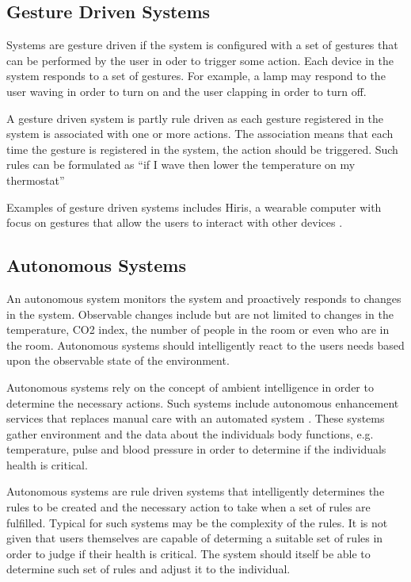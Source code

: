 \subsection{Gesture Driven Systems}

Systems are gesture driven if the system is configured with a set of gestures that can be performed by the user in oder to trigger some action. Each device in the system responds to a set of gestures. For example, a lamp may respond to the user waving in order to turn on and the user clapping in order to turn off.

A gesture driven system is partly rule driven as each gesture registered in the system is associated with one or more actions. The association means that each time the gesture is registered in the system, the action should be triggered. Such rules can be formulated as ``if I wave then lower the temperature on my thermostat''

Examples of gesture driven systems includes Hiris, a wearable computer with focus on gestures that allow the users to interact with other devices \cite{hirisweb}.

\subsection{Autonomous Systems}

An autonomous system monitors the system and proactively responds to changes in the system. Observable changes include but are not limited to changes in the temperature, CO2 index, the number of people in the room or even who are in the room.
Autonomous systems should intelligently react to the users needs based upon the observable state of the environment.

Autonomous systems rely on the concept of ambient intelligence in order to determine the necessary actions. Such systems include autonomous enhancement services that replaces manual care with an automated system \cite{nehmer2006living}. These systems gather environment and the data about the individuals body functions, e.g. temperature, pulse and blood pressure in order to determine if the individuals health is critical.

Autonomous systems are rule driven systems that intelligently determines the rules to be created and the necessary action to take when a set of rules are fulfilled. Typical for such systems may be the complexity of the rules. It is not given that users themselves are capable of determing a suitable set of rules in order to judge if their health is critical. The system should itself be able to determine such set of rules and adjust it to the individual.

